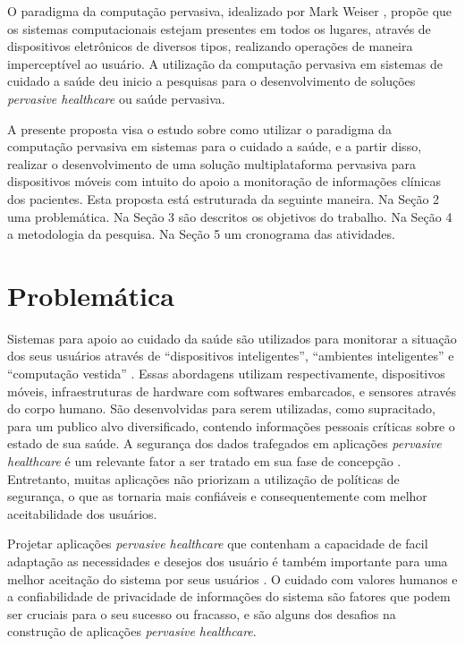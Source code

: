 \documentclass[a4paper,10pt]{article}
\begin{document}
O paradigma da computação pervasiva, idealizado por Mark Weiser \cite{Weiser}, propõe que os 
sistemas computacionais estejam presentes em todos os lugares, através de dispositivos eletrônicos 
de diversos tipos, realizando operações de maneira imperceptível ao usuário. A utilização da 
computação pervasiva em sistemas de cuidado a saúde deu inicio a pesquisas para o desenvolvimento 
de soluções \textit{pervasive healthcare} ou saúde pervasiva.

A presente proposta visa o estudo sobre como utilizar o paradigma da computação pervasiva em sistemas
para o cuidado a saúde, e a partir disso, realizar o desenvolvimento de uma solução 
multiplataforma pervasiva para dispositivos móveis com intuito do apoio a monitoração de informações 
clínicas dos pacientes. Esta proposta está estruturada da seguinte maneira. Na Seção 2 uma problemática. 
Na Seção 3 são descritos os objetivos do trabalho. Na Seção 4 a metodologia da pesquisa. Na Seção 5 um 
cronograma das atividades. 

\section{Problemática}

Sistemas para apoio ao cuidado da saúde são utilizados para monitorar a situação dos seus usuários através 
de “dispositivos inteligentes”, “ambientes inteligentes” e “computação vestida” \cite{Ziefle}. Essas abordagens 
utilizam respectivamente, dispositivos móveis, infraestruturas de hardware com softwares embarcados, e sensores 
através do corpo humano. São desenvolvidas para serem utilizadas, como supracitado, para um publico alvo diversificado, 
contendo informações pessoais críticas sobre o estado de sua saúde. A segurança dos dados trafegados em aplicações 
\textit{pervasive healthcare} é um relevante fator a ser tratado em sua fase de concepção \cite{Moncrieff}. Entretanto, muitas 
aplicações não priorizam a utilização de políticas de segurança, o que as tornaria mais confiáveis e consequentemente 
com melhor aceitabilidade dos usuários.  

Projetar aplicações \textit{pervasive healthcare} que contenham a capacidade de facil adaptação as necessidades 
e desejos dos usuário é também importante para uma melhor aceitação do sistema por seus usuários \cite{Mulder}. O cuidado com valores humanos e a confiabilidade de privacidade 
de informações do sistema são fatores que podem ser cruciais para o seu sucesso ou fracasso, e são 
alguns dos desafios na construção de aplicações \textit{pervasive healthcare}.  
\end{document}
